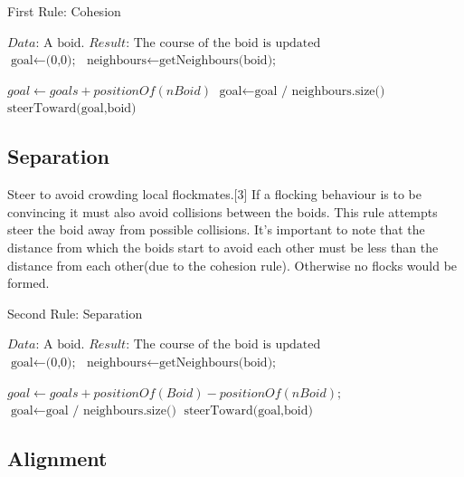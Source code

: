 \documentclass{article}
\begin{document}
\begin{algorithm}
\caption{First Rule: Cohesion}\label{euclid}
\begin{algorithmic}[1]
\State $\textit{Data:   } \text{A boid.}$
\State $\textit{Result:   } \text{The course of the boid is updated}$
\\
\State $\text{goal} \gets \text{(0,0);}$
\State $\text{neighbours} \gets \text{getNeighbours(boid);}$

    \State $ goal \gets goals + positionOf(nBoid)$
\Endfor
\State $\text{goal} \gets \text{goal / neighbours.size()}$
\State $\text{steerToward(goal,boid)}$
\end{algorithmic}

\end{algorithm}

\subsection{Separation}

Steer to avoid crowding local flockmates.[3] If a flocking behaviour is to be convincing it must also avoid collisions between the boids. This rule attempts steer the boid away from possible collisions. It's important to note that the distance from which the boids start to avoid each other must be less than the distance from each other(due to the cohesion rule). Otherwise no flocks would be formed.

\begin{algorithm}
\caption{Second Rule: Separation}\label{euclid}
\begin{algorithmic}[1]
\State $\textit{Data:   } \text{A boid.}$
\State $\textit{Result:   } \text{The course of the boid is updated}$
\\
\State $\text{goal} \gets \text{(0,0);}$
\State $\text{neighbours} \gets \text{getNeighbours(boid);}$

    \State $ goal \gets goals + positionOf(Boid) - positionOf(nBoid);$
\Endfor
\State $\text{goal} \gets \text{goal / neighbours.size()}$
\State $\text{steerToward(goal,boid)}$
\end{algorithmic}

\end{algorithm}

\subsection{Alignment}
\end{document}
